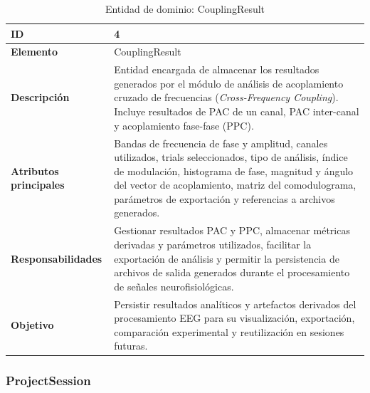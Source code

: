 \documentclass[12pt, letterpaper]{article}
\begin{document}
\begin{table}[H]
\centering

\begin{tabularx}{\textwidth}{|
>{}p{3.9cm}|
Y|
}

\hline
\textbf{ID} & 4 \\ \hline

\textbf{Elemento} & CouplingResult \\ \hline

\textbf{Descripción}
&
Entidad encargada de almacenar los resultados generados por el módulo de
análisis de acoplamiento cruzado de frecuencias
(\textit{Cross-Frequency Coupling}). Incluye resultados de PAC de un canal,
PAC inter-canal y acoplamiento fase-fase (PPC).
\\ \hline

\textbf{Atributos principales}
&
Bandas de frecuencia de fase y amplitud, canales utilizados, trials
seleccionados, tipo de análisis, índice de modulación, histograma de fase,
magnitud y ángulo del vector de acoplamiento, matriz del comodulograma,
parámetros de exportación y referencias a archivos generados.
\\ \hline

\textbf{Responsabilidades}
&
Gestionar resultados PAC y PPC, almacenar métricas derivadas y parámetros
utilizados, facilitar la exportación de análisis y permitir la persistencia
de archivos de salida generados durante el procesamiento de señales
neurofisiológicas.
\\ \hline

\textbf{Objetivo}
&
Persistir resultados analíticos y artefactos derivados del procesamiento EEG
para su visualización, exportación, comparación experimental y reutilización
en sesiones futuras.
\\ \hline

\end{tabularx}

\caption{Entidad de dominio: CouplingResult}
\label{tab:couplingresult}

\end{table}

\subsubsection{ProjectSession}
\end{document}
